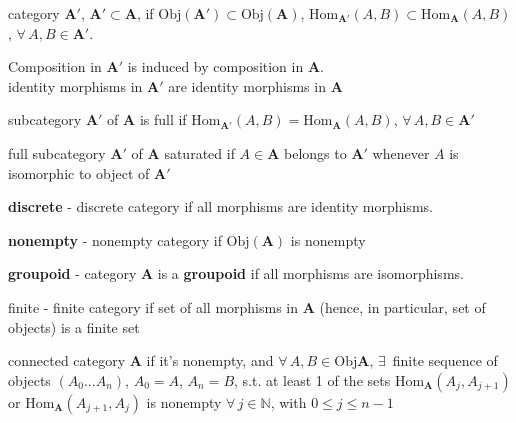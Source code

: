 \begin{definition}[subcategory]
category $\mathbf{A}'$, $\mathbf{A}' \subset \mathbf{A}$, if $\text{Obj}(\mathbf{A}') \subset \text{Obj}(\mathbf{A})$, $\text{Hom}_{\mathbf{A}'}(A,B) \subset \text{Hom}_{\mathbf{A}}(A,B)$, $\forall \, A, B \in \mathbf{A}'$.

Composition in $\mathbf{A}'$ is induced by composition in $\mathbf{A}$.\\
identity morphisms in $\mathbf{A}'$ are identity morphisms in $\mathbf{A}$
\end{definition}

\begin{definition}
	subcategory $\mathbf{A}'$ of $\mathbf{A}$ is full if $\text{Hom}_{\mathbf{A}'}(A,B) = \text{Hom}_{\mathbf{A}}(A,B)$, $\forall \, A, B \in \mathbf{A}'$	
\end{definition}

\begin{definition}
full subcategory $\mathbf{A}'$ of $\mathbf{A}$ saturated if $A \in \mathbf{A}$ belongs to $\mathbf{A}'$ whenever $A$ is isomorphic to object of $\mathbf{A}'$	
\end{definition}

\begin{definition}
	\textbf{discrete} - discrete category if all morphisms are identity morphisms.
\end{definition}

\begin{definition}
	\textbf{nonempty} - nonempty category if $\text{Obj}(\mathbf{A})$ is nonempty
\end{definition}

\begin{definition}[groupoid]
\textbf{groupoid} - category $\mathbf{A}$ is a \textbf{groupoid} if all morphisms are isomorphisms.
\end{definition}

\begin{definition}
	finite - finite category if set of all morphisms in $\mathbf{A}$ (hence, in particular, set of objects) is a finite set
\end{definition}

\begin{definition}[connected]
	connected category $\mathbf{A}$ if it's nonempty, and $\forall \, A,B \in \text{Obj}\mathbf{A}$, $\exists \, $ finite sequence of objects $(A_0 \dots A_n)$, $A_0 = A$, $A_n = B$, s.t. at least 1 of the sets $\text{Hom}_{\mathbf{A}}(A_j, A_{j+1})$ or $\text{Hom}_{\mathbf{A}}(A_{j+1}, A_j)$ is nonempty $\forall \, j \in \mathbb{N}$, with $0\leq j \leq n-1$
\end{definition}

